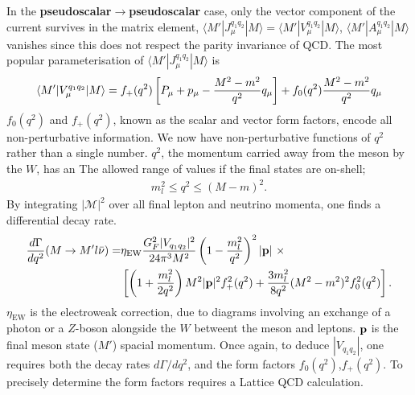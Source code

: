In the {\bf{pseudoscalar$\to$pseudoscalar}} case, only the vector component of the current survives in the matrix element, $\langle M' | J_{\mu}^{q_1q_2} | M \rangle = \langle M' | V_{\mu}^{q_1q_2} | M \rangle$, $\langle M' | A_{\mu}^{q_1q_2} | M \rangle$ vanishes since this does not respect the parity invariance of QCD. The most popular parameterisation of $\langle M' | J_{\mu}^{q_1q_2} | M \rangle$ is
\begin{align}
  \langle M' | V_{\mu}^{q_1q_2} | M \rangle = f_+(q^2) \left[ P_{\mu} + p_{\mu} - {M^2-m^2\over q^2} q_{\mu} \right]  + f_0(q^2) {M^2-m^2\over q^2} q_{\mu} 
\end{align}
$f_0(q^2)$ and $f_+(q^2)$, known as the scalar and vector form factors, encode all non-perturbative information. We now have non-perturbative functions of $q^2$ rather than a single number. $q^2$, the momentum carried away from the meson by the $W$, has an The allowed range of values if the final states are on-shell;
\begin{align}
  m_l^2 \leq q^2 \leq (M-m)^2.
\end{align}
By integrating $|\mathcal{M}|^2$ over all final lepton and neutrino momenta, one finds a differential decay rate.
\begin{align}
  {d\Gamma\over dq^2}(M\to M'l\bar{\nu}) =& \eta_{\text{EW}} { G_F^2 |V_{q_1q_2}|^2\over 24 \pi^3 M^2 } \left( 1 - {m_l^2\over q^2}\right)^2 |{\bf{p}}| \,\,\times \\
  \label{eq:branchingfraction}
  &\left[ \left( 1 + {m_l^2\over 2q^2}\right) M^2 |{\bf{p}}|^2 f_+^2(q^2) + {3m_l^2\over 8q^2} (M^2-m^2)^2 f_0^2(q^2) \right]. \nonumber
\end{align}
$\eta_{\text{EW}}$ is the electroweak correction, due to diagrams involving an exchange of a photon or a $Z$-boson alongside the $W$ betweent the meson and leptons. ${\bf{p}}$ is the final meson state ($M'$) spacial momentum. Once again, to deduce $|V_{q_1q_2}|$, one requires both the decay rates $d\Gamma/dq^2$, and the form factors $f_0(q^2)$,$f_+(q^2)$. To precisely determine the form factors requires a Lattice QCD calculation.


